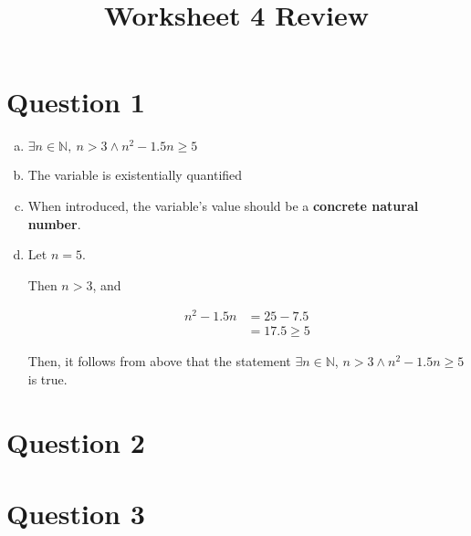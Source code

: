 \documentclass[12pt]{article}
\begin{document}
\title{Worksheet 4 Review}
\maketitle

\section*{Question 1}
\begin{enumerate}[a.]
    \item

    $\exists n \in \mathbb{N},\:n > 3 \land n^2 - 1.5n \geq 5$

    \item

    The variable is existentially quantified

    \item

    When introduced, the variable's value should be a \textbf{concrete natural number}.

    \item

    Let $n = 5$.

    \bigskip

    Then $n > 3$, and

    \begin{align}
        n^2 - 1.5n &= 25 - 7.5\\
        &= 17.5 \geq 5
    \end{align}

    \bigskip

    Then, it follows from above that the statement $\exists n \in \mathbb{N}$,
    $n > 3 \land n^2 -1.5n \geq 5$ is true.
\end{enumerate}

\section*{Question 2}

\section*{Question 3}
\end{document}
